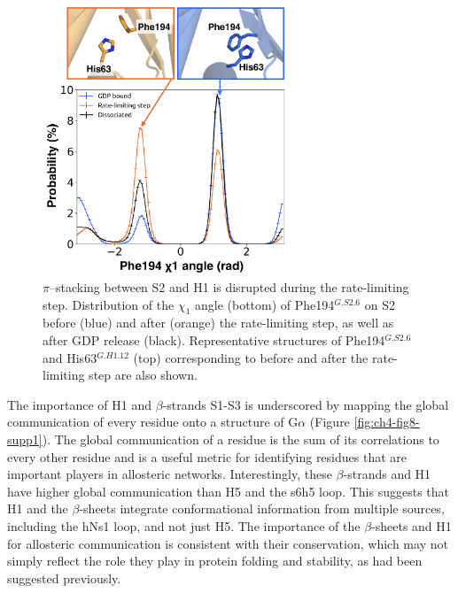 \documentclass[../main.tex]{subfiles}
\begin{document}
        \begin{figure}[!htb] %
            \centering
            \includegraphics[width=3.16in]{ch4-fig9.png}
            \caption[$\pi$–stacking between S2 and H1 is disrupted during the rate-limiting step.]
                {$\pi$–stacking between S2 and H1 is disrupted during the rate-limiting step. Distribution of the $\chi_{1}$ angle (bottom) of Phe194$^{G.S2.6}$ on S2 before (blue) and after (orange) the rate-limiting step, as well as after GDP release (black). Representative structures of Phe194$^{G.S2.6}$ and His63$^{G.H1.12}$ (top) corresponding to before and after the rate-limiting step are also shown.}
            \label{fig:ch4-fig9}
        \end{figure}

        The importance of H1 and $\beta$-strands S1-S3 is underscored by mapping the global communication of every residue onto a structure of G$\alpha$ (Figure \ref{fig:ch4-fig8-supp1}). The global communication of a residue is the sum of its correlations to every other residue and is a useful metric for identifying residues that are important players in allosteric networks\cite{Singh:2017hh}. Interestingly, these $\beta$-strands and H1 have higher global communication than H5 and the s6h5 loop. This suggests that H1 and the $\beta$-sheets integrate conformational information from multiple sources, including the hNs1 loop, and not just H5. The importance of the $\beta$-sheets and H1 for allosteric communication is consistent with their conservation\cite{Sun:2015gj}, which may not simply reflect the role they play in protein folding and stability, as had been suggested previously\cite{Sun:2015gj,Hatley:2003co}.
    \clearpage
\end{document}
